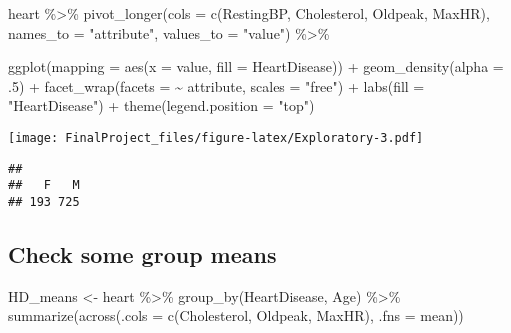 \documentclass[
]{article}
\newenvironment{Shaded}{\begin{snugshade}}{\end{snugshade}}
\newcommand{\AttributeTok}[1]{\textcolor[rgb]{0.77,0.63,0.00}{#1}}
\newcommand{\DecValTok}[1]{\textcolor[rgb]{0.00,0.00,0.81}{#1}}
\newcommand{\FunctionTok}[1]{\textcolor[rgb]{0.00,0.00,0.00}{#1}}
\newcommand{\NormalTok}[1]{#1}
\newcommand{\OtherTok}[1]{\textcolor[rgb]{0.56,0.35,0.01}{#1}}
\newcommand{\SpecialCharTok}[1]{\textcolor[rgb]{0.00,0.00,0.00}{#1}}
\newcommand{\StringTok}[1]{\textcolor[rgb]{0.31,0.60,0.02}{#1}}
\begin{document}
\begin{Shaded}
\begin{Highlighting}[]
\NormalTok{heart }\SpecialCharTok{\%\textgreater{}\%} 
  \FunctionTok{pivot\_longer}\NormalTok{(}\AttributeTok{cols =} \FunctionTok{c}\NormalTok{(RestingBP, Cholesterol, Oldpeak, MaxHR),}
               \AttributeTok{names\_to =} \StringTok{"attribute"}\NormalTok{,}
               \AttributeTok{values\_to =} \StringTok{"value"}\NormalTok{) }\SpecialCharTok{\%\textgreater{}\%} 
  
  \FunctionTok{ggplot}\NormalTok{(}\AttributeTok{mapping =} \FunctionTok{aes}\NormalTok{(}\AttributeTok{x =}\NormalTok{ value,}
                       \AttributeTok{fill =}\NormalTok{ HeartDisease)) }\SpecialCharTok{+} 
  \FunctionTok{geom\_density}\NormalTok{(}\AttributeTok{alpha =}\NormalTok{ .}\DecValTok{5}\NormalTok{) }\SpecialCharTok{+} 
  \FunctionTok{facet\_wrap}\NormalTok{(}\AttributeTok{facets =} \SpecialCharTok{\textasciitilde{}}\NormalTok{ attribute,}
             \AttributeTok{scales =} \StringTok{"free"}\NormalTok{) }\SpecialCharTok{+}
  \FunctionTok{labs}\NormalTok{(}\AttributeTok{fill =} \StringTok{"HeartDisease"}\NormalTok{) }\SpecialCharTok{+}
  \FunctionTok{theme}\NormalTok{(}\AttributeTok{legend.position =} \StringTok{"top"}\NormalTok{)}
\end{Highlighting}
\end{Shaded}

\texttt{[image: FinalProject\_files/figure-latex/Exploratory-3.pdf]}

\begin{Shaded}
\end{Shaded}

\begin{verbatim}
## 
##   F   M 
## 193 725
\end{verbatim}

\hypertarget{check-some-group-means}{%
\subsection{Check some group means}\label{check-some-group-means}}

\begin{Shaded}
\begin{Highlighting}[]
\NormalTok{HD\_means }\OtherTok{\textless{}{-}}
\NormalTok{  heart }\SpecialCharTok{\%\textgreater{}\%} 
  \FunctionTok{group\_by}\NormalTok{(HeartDisease, Age) }\SpecialCharTok{\%\textgreater{}\%} 
  \FunctionTok{summarize}\NormalTok{(}\FunctionTok{across}\NormalTok{(}\AttributeTok{.cols =} \FunctionTok{c}\NormalTok{(Cholesterol, Oldpeak, MaxHR),}
                   \AttributeTok{.fns =}\NormalTok{ mean))}
\end{Highlighting}
\end{Shaded}
\end{document}
